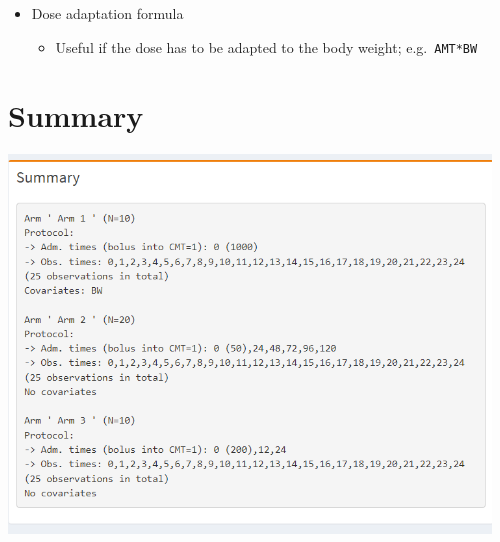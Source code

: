 \documentclass[
]{book}
\providecommand{\tightlist}{%
  \setlength{\itemsep}{0pt}\setlength{\parskip}{0pt}}
\begin{document}
\begin{itemize}
  \begin{itemize}
  \tightlist
  \item
    Covariates or indicator variables that are used in the model code
  \item
    You can enter a single values: e.g.~\texttt{BW=70\textbar{}FLAG=1\textbar{}SEX=1\textbar{}BW=70}
  \item
    Or use the Campsis distribution functions, e.g:

    \begin{itemize}
    \tightlist
    \item
      \texttt{BW=NormalDistribution(mean=70,\ sd=10)}
    \item
      \texttt{BW=LogNormalDistribution(meanlog=log(70),\ sdlog=0.2)}
    \item
      \texttt{HT=UniformDistribution(min=150,\ max=190)}
    \end{itemize}
  \item
    It is also possible to enter a vector of values like so: \texttt{BW=c(50,60,70,80,90)}This is useful if you want to explore only certain specific covariate values. However, in this case you need to make sure that the length of the vector equals the number of subjects in the arm.r
  \item
    See \href{https://calvagone.github.io/campsis.doc/articles/v03_covariates.html}{here} for more information about covariates:
  \end{itemize}
\item
  Dose adaptation formula

  \begin{itemize}
  \tightlist
  \item
    Useful if the dose has to be adapted to the body weight; e.g.~\texttt{AMT*BW}
  \end{itemize}
\end{itemize}

\section{Summary}\label{summary}

\includegraphics[width=5.04167in,height=\textheight]{pictures/design_summary.png}
\end{document}
